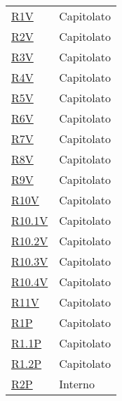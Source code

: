 \begin{center}
\begin{longtable}[!h]{p{50px} p{50px}}
        \hyperref[tab:RequisitiVincolo]{R1V}         & Capitolato                    \\
        \hyperref[tab:RequisitiVincolo]{R2V}         & Capitolato                    \\
        \hyperref[tab:RequisitiVincolo]{R3V}         & Capitolato                    \\
        \hyperref[tab:RequisitiVincolo]{R4V}         & Capitolato                    \\
        \hyperref[tab:RequisitiVincolo]{R5V}         & Capitolato                    \\
        \hyperref[tab:RequisitiVincolo]{R6V}         & Capitolato                    \\
        \hyperref[tab:RequisitiVincolo]{R7V}         & Capitolato                    \\
        \hyperref[tab:RequisitiVincolo]{R8V}         & Capitolato                    \\
        \hyperref[tab:RequisitiVincolo]{R9V}         & Capitolato                    \\
        \hyperref[tab:RequisitiVincolo]{R10V}        & Capitolato                    \\
        \hyperref[tab:RequisitiVincolo]{R10.1V}      & Capitolato                    \\
        \hyperref[tab:RequisitiVincolo]{R10.2V}      & Capitolato                    \\
        \hyperref[tab:RequisitiVincolo]{R10.3V}      & Capitolato                    \\
        \hyperref[tab:RequisitiVincolo]{R10.4V}      & Capitolato                    \\
        \hyperref[tab:RequisitiVincolo]{R11V}        & Capitolato                    \\

        \hyperref[tab:RequisitiPrestazionali]{R1P}   & Capitolato                    \\
        \hyperref[tab:RequisitiPrestazionali]{R1.1P} & Capitolato                    \\
        \hyperref[tab:RequisitiPrestazionali]{R1.2P} & Capitolato                    \\
        \hyperref[tab:RequisitiPrestazionali]{R2P}   & Interno                       \\
    \end{longtable}
\end{center}